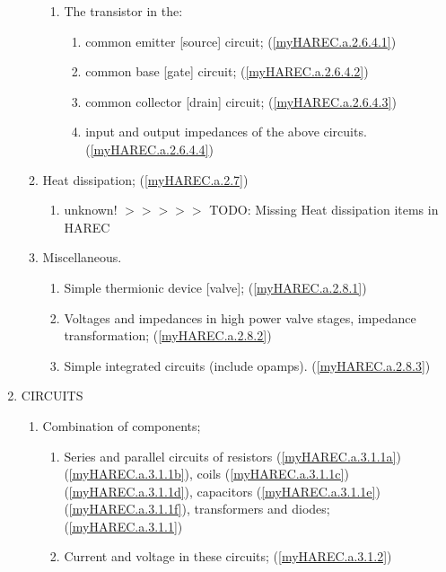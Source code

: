 \begin{enumerate}
\begin{enumerate}[noitemsep]
\begin{enumerate}[noitemsep]
\item The transistor in the:
\begin{enumerate}[noitemsep]
\item common emitter [source] circuit; (\ref{myHAREC.a.2.6.4.1})\label{HAREC.a.2.6.4.1}
\item common base [gate] circuit; (\ref{myHAREC.a.2.6.4.2})\label{HAREC.a.2.6.4.2}
\item common collector [drain] circuit; (\ref{myHAREC.a.2.6.4.3})\label{HAREC.a.2.6.4.3}
\item input and output impedances of the above circuits. (\ref{myHAREC.a.2.6.4.4})\label{HAREC.a.2.6.4.4}
\end{enumerate}
\end{enumerate}
\item Heat dissipation; (\ref{myHAREC.a.2.7})\label{HAREC.a.2.7}
\begin{enumerate}[noitemsep]
\item unknown! $>>>>>$ TODO: Missing Heat dissipation items in HAREC
\end{enumerate}
\item Miscellaneous.
\begin{enumerate}[noitemsep]
\item Simple thermionic device [valve]; (\ref{myHAREC.a.2.8.1})\label{HAREC.a.2.8.1}
\item Voltages and impedances in high power valve stages, impedance transformation; (\ref{myHAREC.a.2.8.2})\label{HAREC.a.2.8.2}
\item Simple integrated circuits (include opamps). (\ref{myHAREC.a.2.8.3})\label{HAREC.a.2.8.3}
\end{enumerate}
\end{enumerate}
\item CIRCUITS
\begin{enumerate}[noitemsep]
\item Combination of components;
\begin{enumerate}[noitemsep]
\item Series and parallel circuits of resistors (\ref{myHAREC.a.3.1.1a})\label{HAREC.a.3.1.1a} (\ref{myHAREC.a.3.1.1b})\label{HAREC.a.3.1.1b}, coils (\ref{myHAREC.a.3.1.1c})\label{HAREC.a.3.1.1c} (\ref{myHAREC.a.3.1.1d})\label{HAREC.a.3.1.1d}, capacitors (\ref{myHAREC.a.3.1.1e})\label{HAREC.a.3.1.1e} (\ref{myHAREC.a.3.1.1f})\label{HAREC.a.3.1.1f}, transformers and diodes; (\ref{myHAREC.a.3.1.1})\label{HAREC.a.3.1.1}
\item Current and voltage in these circuits; (\ref{myHAREC.a.3.1.2})\label{HAREC.a.3.1.2}

\end{enumerate}
\end{enumerate}
\end{enumerate}
